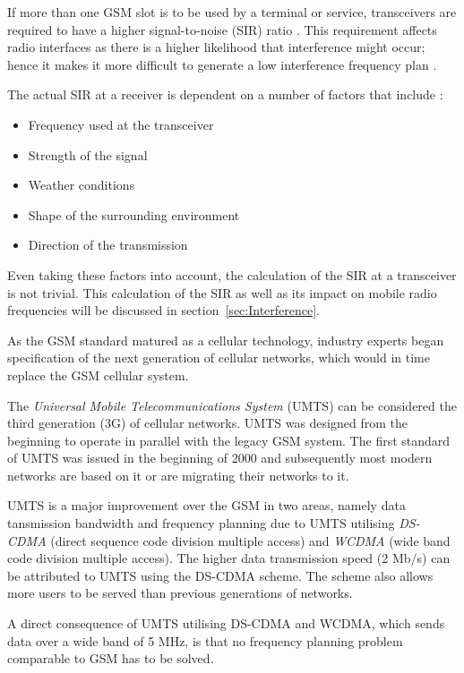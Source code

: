 If more than one GSM slot is to be used by a terminal or service, transceivers are required to have a higher signal-to-noise (SIR) ratio \cite{GSMArchitectureProtocolsServices,GSMSysEngin}. This requirement affects radio interfaces as there is a higher likelihood that interference might occur; hence it makes it more difficult to generate a low interference frequency plan \cite{Eisenblatter,GSMSysEngin}. 

The actual SIR at a receiver is dependent on a number of factors that include \cite{GSMArchitectureProtocolsServices,Karen2004}:
\begin{itemize}
\item Frequency used at the transceiver
\item Strength of the signal
\item Weather conditions
\item Shape of the surrounding environment
\item Direction of the transmission
\end{itemize}
Even taking these factors into account, the calculation of the SIR at a transceiver is not trivial. This calculation of the SIR as well as its impact on mobile radio frequencies will be discussed in section~\ref{sec:Interference}.

As the GSM standard matured as a cellular technology, industry experts began specification of the next generation of cellular networks, which would in time replace the GSM cellular system. 

The \emph{Universal Mobile Telecommunications System} (UMTS) can be considered the third generation (3G) of cellular networks. UMTS was designed from the beginning to operate in parallel with the legacy GSM system. The first standard of UMTS was issued in the beginning of 2000 and subsequently most modern networks are based on it or are migrating their networks to it.

UMTS is a major improvement over the GSM in two areas, namely data tansmission bandwidth and frequency planning due to UMTS utilising \emph{DS-CDMA} (direct sequence code division multiple access) and \emph{WCDMA} (wide band code division multiple access). The higher data transmission speed (2 Mb/s) can be attributed to UMTS using the DS-CDMA scheme. The scheme also allows more users to be served than previous generations of networks\cite{tabuglobalplanning3g,Eisenblatter}. 

A direct consequence of UMTS utilising DS-CDMA and WCDMA, which sends data over a wide band of 5 MHz, is that no frequency planning problem comparable to GSM has to be solved\cite{tabuglobalplanning3g,Eisenblatter}. 

